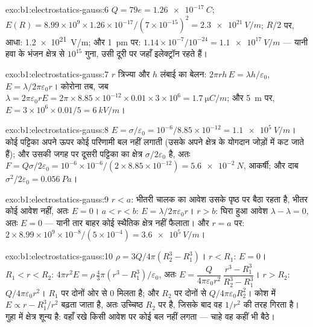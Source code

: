 \begin{solution}{exo:b1:electrostatics-gauss:6}
$Q = 79e = \qty{1.26e-17}{C}$; $E(R) = 8.99 \times 10^9 \times 1.26 \times 10^{-17}/
(7 \times 10^{-15})^2 = \qty{2.3e21}{V/m}$; $R/2$ पर, आधा: \qty{1.2e21}{V/m}; और
\qty{1}{pm} पर: $1.14 \times 10^{-7}/10^{-24} = \qty{1.1e17}{V/m}$ --- यानी हवा
के भंजन क्षेत्र से $10^{15}$ गुना, उसी दूरी पर जहाँ इलेक्ट्रॉन रहते हैं।
\end{solution}

\begin{solution}{exo:b1:electrostatics-gauss:7}
$r$ त्रिज्या और $h$ लंबाई का बेलन: $2\pi rh\,E = \lambda h/\varepsilon_0$, $E =
\lambda/2\pi\varepsilon_0r$। कोरोना तब, जब $\lambda = 2\pi\varepsilon_0 rE = 2\pi \times 8.85 \times
10^{-12} \times 0.01 \times 3 \times 10^6 = \qty{1.7}{\micro C/m}$; और \qty{5}{m} पर,
$E = 3 \times 10^6 \times 0.01/5 = \qty{6}{kV/m}$।
\end{solution}

\begin{solution}{exo:b1:electrostatics-gauss:8}
$E = \sigma/\varepsilon_0 = 10^{-6}/8.85 \times 10^{-12} = \qty{1.1e5}{V/m}$। कोई
पट्टिका अपने ऊपर कोई परिणामी बल नहीं लगाती (उसके अपने क्षेत्र के योगदान
जोड़ों में कट जाते हैं); और उसकी जगह पर दूसरी पट्टिका का क्षेत्र $\sigma/2\varepsilon_0$ है, अतः
$F = Q\sigma/2\varepsilon_0 = 10^{-6} \times 10^{-6}/(2 \times 8.85 \times 10^{-12}) =
\qty{5.6e-2}{N}$, आकर्षी; और दाब $\sigma^2/2\varepsilon_0 = \qty{0.056}{Pa}$।
\end{solution}

\begin{solution}{exo:b1:electrostatics-gauss:9}
$r < a$: भीतरी चालक का आवेश उसके पृष्ठ पर बैठा रहता है, भीतर कोई आवेश नहीं,
अतः $E = 0$। $a < r < b$: $E = \lambda/2\pi\varepsilon_0r$। $r > b$: घिरा हुआ
आवेश $\lambda - \lambda = 0$, अतः $E = 0$ --- यानी तार बाहर कोई स्थैतिक
क्षेत्र नहीं फैलाता। और $r = a$ पर: $2 \times 8.99 \times 10^9 \times 10^{-8}/(5 \times 10^{-4}) =
\qty{3.6e5}{V/m}$।
\end{solution}

\begin{solution}{exo:b1:electrostatics-gauss:10}
$\rho = 3Q/4\pi(R_2^3 - R_1^3)$। $r < R_1$: $E = 0$। $R_1 < r < R_2$: $4\pi r^2E =
\rho\,\tfrac43\pi(r^3 - R_1^3)/\varepsilon_0$, अतः $E = \dfrac{Q}{4\pi\varepsilon_0r^2}\,
\dfrac{r^3 - R_1^3}{R_2^3 - R_1^3}$। $r > R_2$: $Q/4\pi\varepsilon_0r^2$। $R_1$ पर दोनों
ओर से $0$ मिलता है; और $R_2$ पर दोनों से $Q/4\pi\varepsilon_0R_2^2$। कोश में $E
\propto r - R_1^3/r^2$ बढ़ता जाता है, अतः उच्चिष्ठ $R_2$ पर है, जिसके बाद
वह $1/r^2$ की तरह गिरता है। गुहा में क्षेत्र शून्य है: वहाँ रखे किसी आवेश
पर कोई बल नहीं लगता --- चाहे वह कहीं भी बैठे।
\end{solution}

